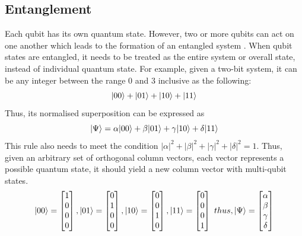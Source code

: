 \documentclass[12pt]{third-rep}
\begin{document}
\subsection{Entanglement}
Each qubit has its own quantum state. However, two or more qubits can act on one another which leads to the formation of an entangled system \cite{entangle}. When qubit states are entangled, it needs to be treated as the entire system or overall state, instead of individual quantum state. For example, given a two-bit system, it can be any integer between the range 0 and 3 inclusive as the following:
$${\left\vert{00}\right\rangle}+{\left\vert{01}\right\rangle}+{\left\vert{10}\right\rangle}+{\left\vert{11}\right\rangle}$$
Thus, its normalised superposition can be expressed as
$${\left\vert{\Psi}\right\rangle}=\alpha{\left\vert{00}\right\rangle}+\beta{\left\vert{01}\right\rangle}+\gamma{\left\vert{10}\right\rangle}+\delta{\left\vert{11}\right\rangle}$$
This rule also needs to meet the condition $|\alpha|^2+|\beta|^2+|\gamma|^2+|\delta|^2=1$. Thus, given an arbitrary set of orthogonal column vectors, each vector represents a possible quantum state, it should yield a new column vector with multi-qubit states.
\[
{\left\vert{00}\right\rangle}=
\begin{bmatrix}
    1 \\
    0 \\
    0 \\
    0
\end{bmatrix}
,{\left\vert{01}\right\rangle}=
\begin{bmatrix}
    0 \\
    1 \\
    0 \\
    0
\end{bmatrix}
,{\left\vert{10}\right\rangle}=
\begin{bmatrix}
    0 \\
    0 \\
    1 \\
    0
\end{bmatrix}
,{\left\vert{11}\right\rangle}=
\begin{bmatrix}
    0 \\
    0 \\
    0 \\
    1
\end{bmatrix}
\ thus, {\left\vert{\Psi}\right\rangle}=
\begin{bmatrix}
    \alpha \\
    \beta \\
    \gamma \\
    \delta
\end{bmatrix}
\]
\end{document}
